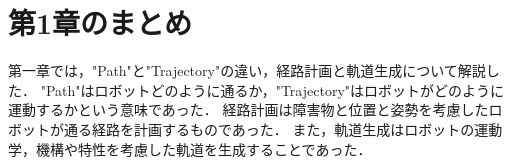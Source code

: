 
\section{第1章のまとめ}

第一章では，"Path"と"Trajectory"の違い，経路計画と軌道生成について解説した．
"Path"はロボットどのように通るか，"Trajectory"はロボットがどのように運動するかという意味であった．
経路計画は障害物と位置と姿勢を考慮したロボットが通る経路を計画するものであった．
また，軌道生成はロボットの運動学，機構や特性を考慮した軌道を生成することであった．
\newpage
